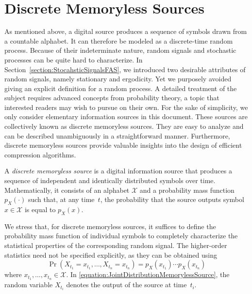 \section{Discrete Memoryless Sources}

As mentioned above, a digital source produces a sequence of symbols drawn from a countable alphabet.
It can therefore be modeled as a discrete-time random process.
Because of their indeterminate nature, random signals and stochastic processes can be quite hard to characterize.
In Section~\ref{section:StocahsticSignalsFAS}, we introduced two desirable attributes of random signals, namely stationary and ergodicity.
Yet we purposely avoided giving an explicit definition for a random process.
A detailed treatment of the subject requires advanced concepts from probability theory, a topic that interested readers may wish to pursue on their own.
For the sake of simplicity, we only consider elementary information sources in this document.
These sources are collectively known as discrete memoryless sources.
They are easy to analyze and can be described unambiguously in a straightforward manner.
Furthermore, discrete memoryless sources provide valuable insights into the design of efficient compression algorithms.

\begin{definition}
A \emph{discrete memoryless source} is a digital information source that produces a sequence of independent and identically distributed symbols over time.
Mathematically, it consists of an alphabet $\mathcal{X}$ and a probability mass function $p_X(\cdot)$ such that, at any time~$t$, the probability that the source outputs symbol $x \in \mathcal{X}$ is equal to $p_X(x)$.
\end{definition}

We stress that, for discrete memoryless sources, it suffices to define the probability mass function of individual symbols to completely characterize the statistical properties of the corresponding random signal.
The higher-order statistics need not be specified explicitly, as they can be obtained using
\begin{equation} \label{equation:JointDistributionMemorylessSource}
\Pr (X_{t_1} = x_{t_1}, \ldots, X_{t_n} = x_{t_n})
= p_X(x_{t_1})  \cdots p_X(x_{t_n})
\end{equation}
where $x_{t_1}, \ldots, x_{t_n} \in \mathcal{X}$.
In \eqref{equation:JointDistributionMemorylessSource}, the random variable $X_{t_i}$ denotes the output of the source at time~$t_i$.

